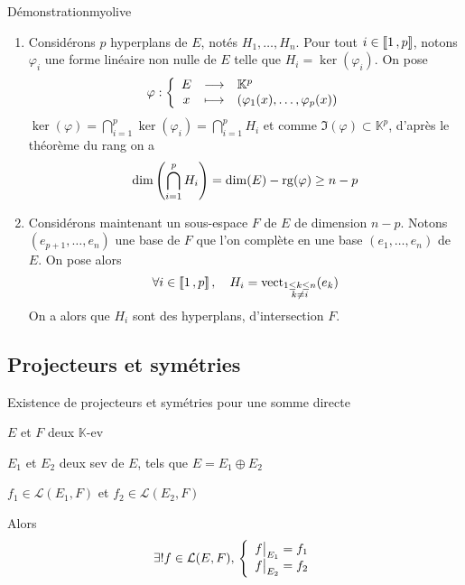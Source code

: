     \begin{demo}{Démonstration}{myolive}
        \begin{enumerate}
            \item Considérons $p$ hyperplans de $E$, notés $H_1,\ldots,H_n$. Pour tout $i \in \left\llbracket 1 \, , p \right\rrbracket$, notons $\varphi_i$ une forme linéaire non nulle de $E$ telle que $H_i = \ker(\varphi_i)$. On pose 
            \[ \fonction{\varphi}{E}{\mathbb{K}^p}{x}{(\varphi_1(x),\ldots,\varphi_p(x))} \]   
            $\ker(\varphi) = \bigcap_{i=1}^p \ker(\varphi_i) = \bigcap_{i=1}^p H_i$ et comme $\Im(\varphi) \subset \mathbb{K}^p$, d’après le théorème du rang on a 
            \[ \dim\left( \bigcap_{i=1}^p H_i \right) = \dim(E) - \operatorname{rg}(\varphi) \geq n-p \]  
            \item Considérons maintenant un sous-espace $F$ de $E$ de dimension $n-p$. Notons $(e_{p+1}, \ldots, e_n)$ une base de $F$ que l’on complète en une base $(e_1,\ldots, e_n)$ de $E$. On pose alors 
            \[ \forall i \in \left\llbracket 1 \, , p \right\rrbracket, \quad H_i = \operatorname{vect}_{\substack{1 \leq k \leq n \\ k \neq i}} (e_k) \]
            On a alors que $H_i$ sont des hyperplans, d’intersection $F$.
        \end{enumerate}
    \end{demo}

\subsection{Projecteurs et symétries}

    \begin{theo}{Existence de projecteurs et symétries pour une somme directe}{}
        \begin{soient}
            \item $E$ et $F$ deux $\mathbb{K}$-ev
            \item $E_1$ et $E_2$ deux sev de $E$, tels que $E = E_1 \oplus E_2$
            \item $f_1 \in \mathcal{L}(E_1,F)$ et $f_2 \in \mathcal{L}(E_2,F)$
        \end{soient}
        Alors \[ \exists ! f \in \mathcal{L}(E,F), \, \left\{ \begin{array}{l}
        \restr{f}{E_1} = f_1 \\
        \restr{f}{E_2} = f_2
        \end{array} \right. \]
    \end{theo}

